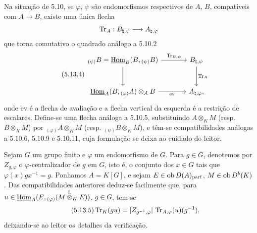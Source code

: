 Na situação de 5.10, se $\varphi$, $\psi$ são endomorfismos respectivos de $A$, $B$, compatíveis com $A\to B$, existe uma única flecha
\[
\operatorname{Tr}_A:B_{\natural,\psi}\longrightarrow A_{\natural,\varphi}
\]
que torna comutativo o quadrado análogo a 5.10.2
\begin{equation}\tag{5.13.4}
\begin{tikzcd}[column sep=large,row sep=large]
{}_{(\psi)}B=\uHom_B(B,{}_{(\psi)}B) \arrow[r,"\Tr_{B,\psi}"] \arrow[d] & B_{\natural,\psi} \arrow[d,"\Tr_A"]\\
\uHom_A(B,{}_{(\varphi)}A)\otimes_AB \arrow[r,"\mathrm{ev}"'] & A_{\natural,\varphi},
\end{tikzcd}
\end{equation}
onde $\mathrm{\acute{e}v}$ é a flecha de avaliação e a flecha vertical da esquerda é a restrição de escalares. Define-se uma flecha análoga a 5.10.5, substituindo $A\otimes_KM$ (resp. $B\otimes_KM$) por ${}_{(\varphi)}A\otimes_KM$ (resp. ${}_{(\psi)}B\otimes_KM$), e têm-se compatibilidades análogas a 5.10.6, 5.10.9 e 5.10.11, cuja formulação se deixa ao cuidado do leitor.

Sejam $G$ um grupo finito e $\varphi$ um endomorfismo de $G$. Para $g\in G$, denotemos por $Z_{g,\varphi}$ o $\varphi$-centralizador de $g$ em $G$, isto é, o conjunto dos $x\in G$ tais que $\varphi(x)gx^{-1}=g$. Ponhamos $A=K[G]$, e sejam $E\in\operatorname{ob} D(A)_{\mathrm{parf}}$, $M\in\operatorname{ob} D^b(K)$. Das compatibilidades anteriores deduz-se facilmente que, para $u\in\underline{\operatorname{Hom}}_A(E,{}_{(\varphi)}(M\overset{\mathrm L}{\otimes}_KE))$, $g\in G$, tem-se
\begin{equation}\tag{5.13.5}
\operatorname{Tr}_K(gu)=|Z_{g^{-1},\varphi}|\,\operatorname{Tr}_{A,\varphi}(u)(g^{-1}),
\end{equation}
deixando-se ao leitor os detalhes da verificação.
